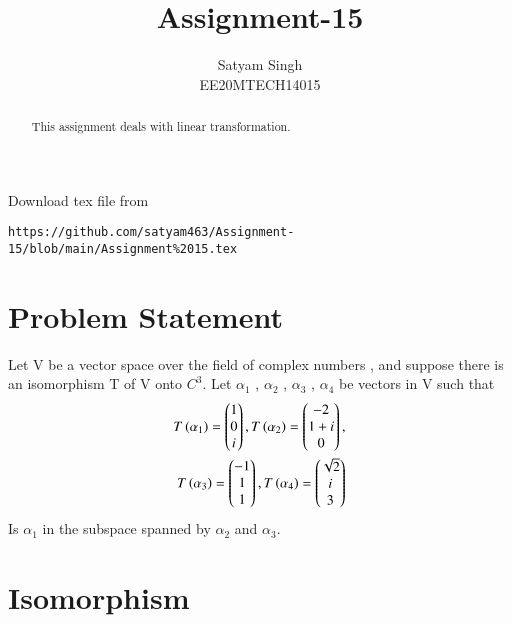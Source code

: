 \documentclass[journal,12pt,twocolumn]{IEEEtran}
\begin{document}
\renewcommand{\thefigure}{\theproblem}
\def\putbox#1#2#3{\makebox[0in][l]{\makebox[#1][l]{}\raisebox{\baselineskip}[0in][0in]{\raisebox{#2}[0in][0in]{#3}}}}
     \def\rightbox#1{\makebox[0in][r]{#1}}
     \def\centbox#1{\makebox[0in]{#1}}
     \def\topbox#1{\raisebox{-\baselineskip}[0in][0in]{#1}}
     \def\midbox#1{\raisebox{-0.5\baselineskip}[0in][0in]{#1}}
\vspace{3cm}
\title{Assignment-15}
\author{Satyam Singh \\ EE20MTECH14015}
\maketitle
\newpage
\bigskip
\renewcommand{\thefigure}{\theenumi}
\renewcommand{\thetable}{\theenumi}
\begin{abstract}
This assignment deals with linear transformation.
\end{abstract}
Download  tex file from 
\begin{lstlisting}
https://github.com/satyam463/Assignment-15/blob/main/Assignment%2015.tex
\end{lstlisting}
\section{Problem Statement}
Let V be a vector space over the field of complex numbers , and suppose there is an isomorphism T of V onto $C^{3}$. Let $\alpha_1$ , $\alpha_2$ , $\alpha_3$  , $\alpha_4$ be vectors in V such that 
   \begin{multline}
    \begin{aligned}
    T\left(\alpha_1\right)=\begin{pmatrix}1\\0\\i\end{pmatrix} , T\left(\alpha_2\right)=\begin{pmatrix}-2\\1+i\\0\end{pmatrix} ,\\ T\left(\alpha_3\right)=\begin{pmatrix}-1\\1\\1\end{pmatrix} , T\left(\alpha_4\right)=\begin{pmatrix}\sqrt{2}\\i\\3\end{pmatrix}
    \end{aligned}
    \end{multline}
    Is $\alpha_1$ in the subspace spanned by $\alpha_2$ and $\alpha_3$.
\section{Isomorphism}
\end{document}
